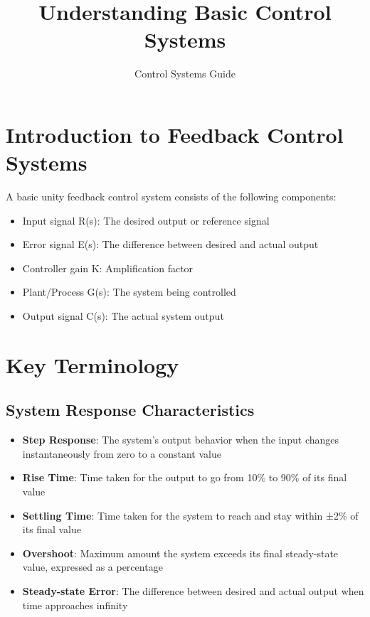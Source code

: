 \documentclass{article}
\title{Understanding Basic Control Systems}
\author{Control Systems Guide}
\date{}
\begin{document}
\maketitle

\section{Introduction to Feedback Control Systems}
A basic unity feedback control system consists of the following components:
\begin{itemize}
    \item Input signal R(s): The desired output or reference signal
    \item Error signal E(s): The difference between desired and actual output
    \item Controller gain K: Amplification factor
    \item Plant/Process G(s): The system being controlled
    \item Output signal C(s): The actual system output
\end{itemize}

\section{Key Terminology}

\subsection{System Response Characteristics}
\begin{itemize}
    \item \textbf{Step Response}: The system's output behavior when the input changes instantaneously from zero to a constant value
    \item \textbf{Rise Time}: Time taken for the output to go from 10\% to 90\% of its final value
    \item \textbf{Settling Time}: Time taken for the system to reach and stay within ±2\% of its final value
    \item \textbf{Overshoot}: Maximum amount the system exceeds its final steady-state value, expressed as a percentage
    \item \textbf{Steady-state Error}: The difference between desired and actual output when time approaches infinity
\end{itemize}
\end{document}

